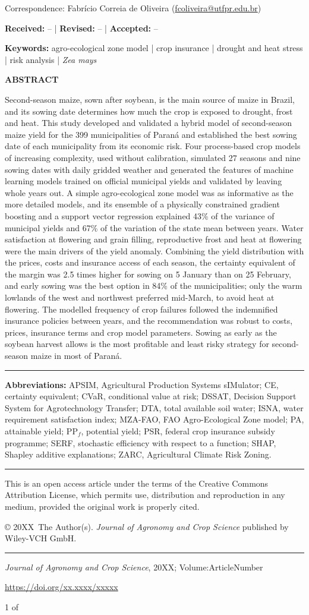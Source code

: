 \documentclass[10pt,a4paper]{article}
\makeatletter
\newcommand{\CorrespondenceBlock}{%
Correspondence:
Fabrício Correia de Oliveira
(\href{mailto:fcoliveira@utfpr.edu.br}{fcoliveira@utfpr.edu.br})
}
\newcommand{\KeywordsBlock}{%
agro-ecological zone model \;|\;
crop insurance \;|\;
drought and heat stress \;|\;
risk analysis \;|\;
\textit{Zea mays}
}
\newcommand{\AbbreviationsBlock}{%
APSIM, Agricultural Production Systems sIMulator; CE, certainty equivalent; CVaR, conditional value at
risk; DSSAT, Decision Support System for Agrotechnology Transfer; DTA, total available soil water;
ISNA, water requirement satisfaction index; MZA-FAO, FAO Agro-Ecological Zone model; PA, attainable
yield; PP$_f$, potential yield; PSR, federal crop insurance subsidy programme; SERF, stochastic efficiency
with respect to a function; SHAP, Shapley additive explanations; ZARC, Agricultural Climate Risk Zoning.
}
\newcommand{\RunningYear}{20XX}
\newcommand{\VolumeInfo}{%
Volume:ArticleNumber
}
\newcommand{\DOIInfo}{%
https://doi.org/xx.xxxx/xxxxx
}
\newcommand{\AbstractText}{%
\noindent
Second-season maize, sown after soybean, is the main source of maize in Brazil, and its sowing date
determines how much the crop is exposed to drought, frost and heat. This study developed and validated a
hybrid model of second-season maize yield for the 399 municipalities of Paraná and established the best
sowing date of each municipality from its economic risk. Four process-based crop models of increasing
complexity, used without calibration, simulated 27 seasons and nine sowing dates with daily gridded
weather and generated the features of machine learning models trained on official municipal yields and
validated by leaving whole years out. A simple agro-ecological zone model was as informative as the more
detailed models, and its ensemble of a physically constrained gradient boosting and a support vector
regression explained 43\% of the variance of municipal yields and 67\% of the variation of the state mean
between years. Water satisfaction at flowering and grain filling, reproductive frost and heat at
flowering were the main drivers of the yield anomaly. Combining the yield distribution with the prices,
costs and insurance access of each season, the certainty equivalent of the margin was 2.5 times higher for
sowing on 5 January than on 25 February, and early sowing was the best option in 84\% of the
municipalities; only the warm lowlands of the west and northwest preferred mid-March, to avoid heat at
flowering. The modelled frequency of crop failures followed the indemnified insurance policies between
years, and the recommendation was robust to costs, prices, insurance terms and crop model parameters.
Sowing as early as the soybean harvest allows is the most profitable and least risky strategy for
second-season maize in most of Paraná.
}
\newcommand{\AbstractBox}[1]{%

\vspace{0.30cm}

\noindent
\colorbox{JACGray}{%
    \parbox{\dimexpr\textwidth-2\fboxsep\relax}{%

        \vspace{0.20cm}

        {\large\bfseries ABSTRACT}

        \vspace{0.10cm}

        \justifying

        #1

        \vspace{0.14cm}

    }%
}

}
\makeatother
\begin{document}
\vspace{0.18cm}

{\footnotesize
\CorrespondenceBlock
\par
}

\vspace{0.08cm}

{\footnotesize

\textbf{Received:} -- 
\;|\;
\textbf{Revised:} --
\;|\;
\textbf{Accepted:} --

\par
}

\vspace{0.08cm}

{\footnotesize

\textbf{Keywords:}
\KeywordsBlock

\par
}

\AbstractBox{\AbstractText}

\vspace*{\fill}

{\scriptsize

\hrule

\vspace{0.10cm}

\textbf{Abbreviations:}
\AbbreviationsBlock

\vspace{0.10cm}

\hrule

\vspace{0.10cm}

This is an open access article under the terms of the
Creative Commons Attribution License, which permits use,
distribution and reproduction in any medium,
provided the original work is properly cited.

\vspace{0.08cm}

© \RunningYear\ The Author(s).
\textit{Journal of Agronomy and Crop Science}
published by Wiley-VCH GmbH.

\vspace{0.10cm}

\hrule

\vspace{0.10cm}

\textit{Journal of Agronomy and Crop Science},
\RunningYear;
\VolumeInfo

\href{\DOIInfo}{\DOIInfo}

\hfill
1 of \pageref{LastPage}

}
\end{document}
